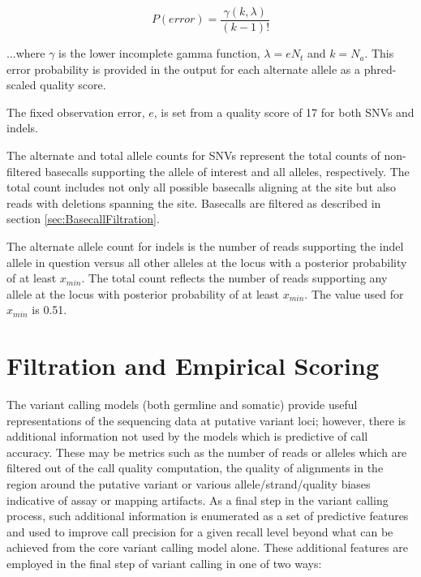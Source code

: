 \documentclass{article}
\begin{document}
\begin{equation*}
P(error) = \frac{\gamma(k,\lambda)}{(k-1)!}
\end{equation*}

...where $\gamma$ is the lower incomplete gamma function, $\lambda = e N_t$ and $k = N_a$. This error probability is provided in the output for each alternate allele as a phred-scaled quality score.

The fixed observation error, $e$, is set from a quality score of 17 for both SNVs and indels.

The alternate and total allele counts for SNVs represent the total counts of non-filtered basecalls supporting the allele of interest and all alleles, respectively. The total count includes not only all possible basecalls aligning at the site but also reads with deletions spanning the site. Basecalls are filtered as described in section \ref{sec:BasecallFiltration}.

The alternate allele count for indels is the number of reads supporting the indel allele in question versus all other alleles at the locus with a posterior probability of at least $x_{min}$. The total count reflects the number of reads supporting any allele at the locus with posterior probability of at least $x_{min}$. The value used for $x_{min}$ is 0.51.


\section{Filtration and Empirical Scoring}
\label{sec:FiltrationAndScoring}

The variant calling models (both germline and somatic) provide useful representations of the sequencing data at putative variant loci; however, there is additional information not used by the models which is predictive of call accuracy. These may be metrics such as the number of reads or alleles which are filtered out of the call quality computation, the quality of alignments in the region around the putative variant or various allele/strand/quality biases indicative of assay or mapping artifacts. As a final step in the variant calling process, such additional information is enumerated as a set of predictive features and used to improve call precision for a given recall level beyond what can be achieved from the core variant calling model alone. These additional features are employed in the final step of variant calling in one of two ways:
\end{document}
